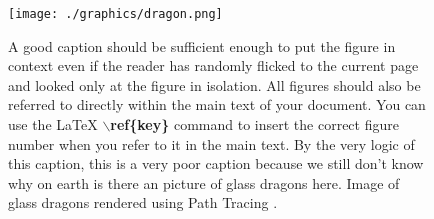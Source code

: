 \begin{figure}[H]
	\centering

	\texttt{[image: ./graphics/dragon.png]}
	
	\caption[An image of many glass dragons being used to demonstrate typesetting a figure.]{A good caption should be sufficient enough to put the figure in context even if the reader has randomly flicked to the current page and looked only at the figure in isolation. All figures should also be referred to directly within the main text of your document. You can use the LaTeX \textbf{$\backslash$ref\{key\}} command to insert the correct figure number when you refer to it in the main text. By the very logic of this caption, this is a very poor caption because we still don't know why on earth is there an picture of glass dragons here. Image of glass dragons rendered using Path Tracing \cite{whittle15_dragons}.}
	
	\label{fig:dragon}
	
\end{figure}